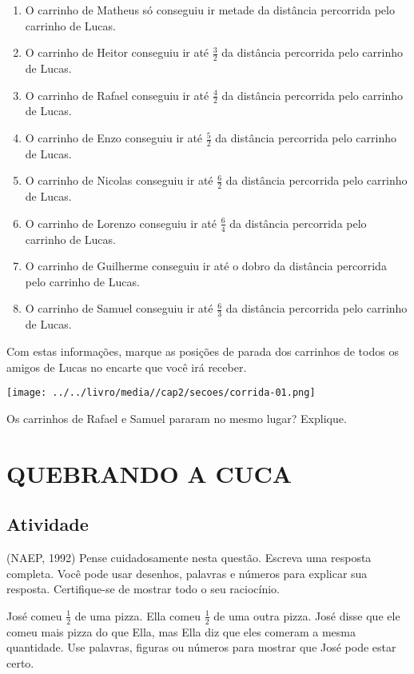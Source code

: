 \begin{enumerate} [\quad a)] %
  \item     O carrinho de Matheus só conseguiu ir metade da distância percorrida pelo carrinho de Lucas.
  \item     O carrinho de Heitor conseguiu ir até     $\frac{3}{2}$     da distância percorrida pelo carrinho de Lucas. 
  \item     O carrinho de Rafael conseguiu ir até     $\frac{4}{2}$     da distância percorrida pelo carrinho de Lucas.
  \item     O carrinho de Enzo conseguiu ir até     $\frac{5}{2}$     da distância percorrida pelo carrinho de Lucas. 
  \item     O carrinho de Nicolas conseguiu ir até     $\frac{6}{2}$     da distância percorrida pelo carrinho de Lucas. 
  \item     O carrinho de Lorenzo conseguiu ir até     $\frac{6}{4}$     da distância percorrida pelo carrinho de Lucas. 
  \item     O carrinho de Guilherme conseguiu ir até o dobro da distância percorrida pelo carrinho de Lucas.
  \item     O carrinho de Samuel conseguiu ir até     $\frac{6}{3}$     da distância percorrida pelo carrinho de Lucas. 
\end{enumerate} %


Com estas informações, marque as posições de parada dos carrinhos de todos os amigos de Lucas no encarte que você irá receber.

\texttt{[image: ../../livro/media//cap2/secoes/corrida-01.png]}

Os carrinhos de Rafael e Samuel pararam no mesmo lugar? Explique.

\section{QUEBRANDO A CUCA }

\subsection{Atividade}

(NAEP, 1992) Pense cuidadosamente nesta questão. Escreva uma resposta completa. Você pode usar desenhos, palavras e números para explicar sua resposta. Certifique-se de mostrar todo o seu raciocínio.

José comeu $\frac{1}{2}$ de uma pizza. Ella comeu $\frac{1}{2}$ de uma outra pizza. José disse que ele comeu mais pizza do que Ella, mas Ella diz que eles comeram a mesma quantidade. Use palavras, figuras ou números para mostrar que José pode estar certo.

